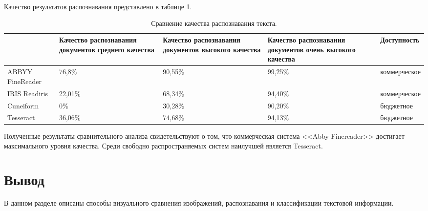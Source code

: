 Качество результатов распознавания представлено в таблице \ref{table:comparetext}.

\begin{table}[H]
\caption{Сравнение качества распознавания текста.}
\begin{tabular}{|p{3cm}|p{3cm}|p{3cm}|p{3cm}|p{3cm}|}
\hline
& Качество распознавания документов среднего качества & Качество распознавания документов высокого качества & Качество распознавания документов очень высокого качества & Доступность \\ \hline
ABBYY FineReader & 76,8\% & 90,55\% & 99,25\% & коммерческое\\ \hline
IRIS Readiris & 22,01\% & 68,34\% & 94,40\% & коммерческое \\ \hline
Cuneiform & 0\% & 30,28\% & 90,20\% & бюджетное \\ \hline
Tesseract & 36,06\% & 74,68\% & 94,13\% & бюджетное \\ \hline
\end{tabular}
\label{table:comparetext}
\end{table}

Полученные результаты сравнительного анализа свидетельствуют о том, что коммерческая система <<Abby Finereader>> достигает максимального уровня качества. Среди свободно распространяемых систем наилучшей является Tesseract.

\section{Вывод}

В данном разделе описаны способы визуального сравнения изображений, распознавания и классификации текстовой информации.
